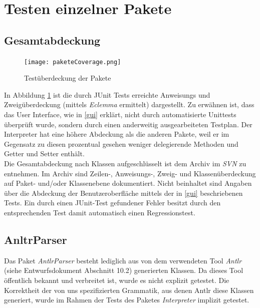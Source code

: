 \documentclass[parskip=full]{scrartcl}
\begin{document}
\newpage
\section{Testen einzelner Pakete}\label{einzelnePakete}

\subsection{Gesamtabdeckung}\label{abdeckung}
\begin{figure}[!h]
\centering
\texttt{[image: paketeCoverage.png]}
\caption{Testüberdeckung der Pakete}\label{AbdeckungPakete}
\end{figure}

In Abbildung \ref{AbdeckungPakete} ist die durch JUnit Tests erreichte Anweisungs und Zweigüberdeckung (mittels \textit{Eclemma} ermittelt) dargestellt. Zu erwähnen ist, dass das User Interface, wie in \ref{gui} erklärt, nicht durch automatisierte Unittests überprüft wurde, sondern durch einen anderweitig ausgearbeiteten Testplan. Der Interpreter hat eine höhere Abdeckung als die anderen Pakete, weil er im Gegensatz zu diesen prozentual gesehen weniger delegierende Methoden und Getter und Setter enthält.\\
Die Gesamtabdeckung nach Klassen aufgeschlüsselt ist dem Archiv im \textit{SVN} zu entnehmen.
Im Archiv sind Zeilen-, Anweisungs-, Zweig- und Klassenüberdeckung auf Paket- und/oder Klassenebene dokumentiert.
Nicht beinhaltet sind Angaben über die Abdeckung der Benutzeroberfläche mittels der in \ref{gui} beschriebenen Tests.
Ein durch einen JUnit-Test gefundener Fehler besitzt durch den entsprechenden Test damit automatisch einen Regressionstest.

\subsection{AnltrParser}\label{ANTLRPARSER}
Das Paket \textit{AntlrParser} besteht lediglich aus von dem verwendeten Tool \textit{Antlr} (siehe Entwurfsdokument Abschnitt 10.2) generierten Klassen. Da dieses Tool öffentlich bekannt und verbreitet ist, wurde es nicht explizit getestet. Die Korrektheit der von uns spezifizierten Grammatik, aus denen Antlr diese Klassen generiert, wurde im Rahmen der Tests des Paketes \textit{Interpreter} implizit getestet.
\end{document}
